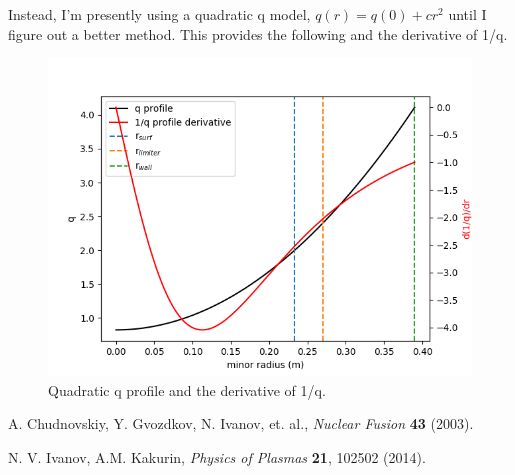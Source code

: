 \documentclass{article}
\begin{document}
Instead, I'm presently using a quadratic q model, $q(r)=q(0)+cr^2$ until I figure out a better method.  This provides the following and the derivative of 1/q.  



\begin{figure}[htb]
	\includegraphics[width=15cm]{images/quadraticQProfile.png}
	\caption{Quadratic q profile and the derivative of 1/q.
		\label{fig:schedule}}    
\end{figure}  




\begin{thebibliography}{}

A. Chudnovskiy, Y. Gvozdkov, N. Ivanov, et. al.,
\emph{Nuclear Fusion}
{\bf 43} (2003). 

N. V. Ivanov, A.M. Kakurin,
\emph{Physics of Plasmas}
{\bf 21}, 102502 (2014). 


\end{thebibliography}

\end{document}
